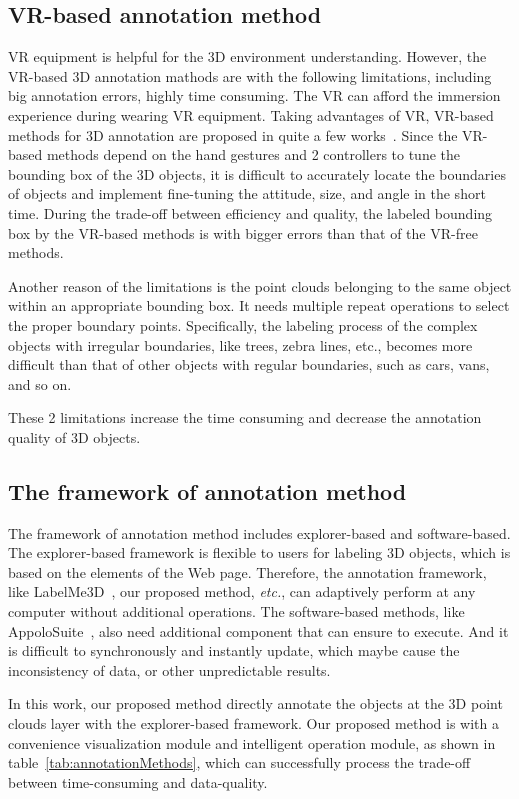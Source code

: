 \documentclass[letterpaper, 10 pt, conference]{ieeeconf}  %
\begin{document}
\subsection{VR-based annotation method}
VR equipment is helpful for the 3D environment understanding. However, the VR-based 3D annotation mathods are with the following limitations, including big annotation errors, highly time consuming. The VR can afford the immersion experience during wearing VR equipment. Taking advantages of VR, VR-based methods for 3D annotation are proposed in quite a few works~\cite{pointatme,wilkes20123dVR,coffey2011interactiveVR}. Since the VR-based methods depend on the hand gestures and 2 controllers to tune the bounding box of the 3D objects, it is difficult to accurately locate the boundaries of objects and implement fine-tuning the attitude, size, and angle in the short time. During the trade-off between efficiency and quality, the labeled bounding box by the VR-based methods is with bigger errors than that of the VR-free methods.

Another reason of the limitations is the point clouds belonging to the same object within an appropriate bounding box.
It needs multiple repeat operations to select the proper boundary points.
Specifically, the labeling process of the complex objects with irregular boundaries, like trees, zebra lines, etc., becomes more difficult than that of other objects with regular boundaries, such as cars, vans, and so on.

These 2 limitations increase the time consuming and decrease the annotation quality of 3D objects.
\subsection{The framework of annotation method}
The framework of annotation method includes explorer-based and software-based. The explorer-based framework is flexible to users for labeling 3D objects, which is based on the elements of the Web page. Therefore, the annotation framework, like LabelMe3D~\cite{LabelMe3D}, our proposed method, \emph{etc.}, can adaptively perform at any computer without additional operations. The software-based methods, like AppoloSuite~\cite{SUPERVISELY,wang2019apolloscape}, also need additional component that can ensure to execute. And it is difficult to synchronously and instantly update, which maybe cause the inconsistency of data, or other unpredictable results.

In this work, our proposed method directly annotate the objects at the 3D point clouds layer with the explorer-based framework. Our proposed method is with a convenience visualization module and intelligent operation module, as shown in table~\ref{tab:annotationMethods}, which can successfully process the trade-off between time-consuming and data-quality.
\end{document}
